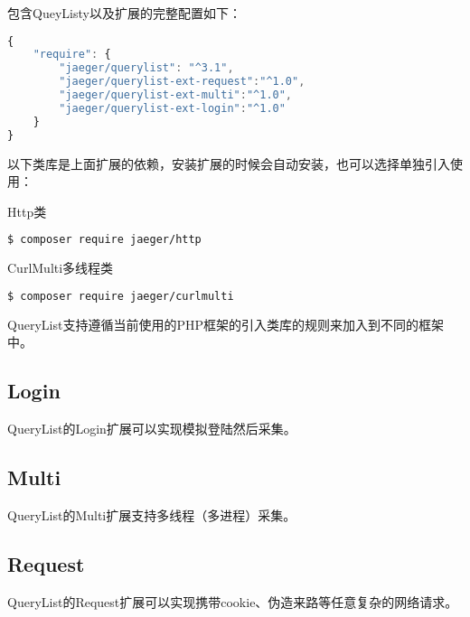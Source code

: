 包含QueyListy以及扩展的完整配置如下：

\begin{lstlisting}[language=JavaScript]
{
    "require": {
        "jaeger/querylist": "^3.1",
        "jaeger/querylist-ext-request":"^1.0",
        "jaeger/querylist-ext-multi":"^1.0",
        "jaeger/querylist-ext-login":"^1.0"
    }
}
\end{lstlisting}

以下类库是上面扩展的依赖，安装扩展的时候会自动安装，也可以选择单独引入使用：

\begin{compactitem}
\item Http类

\begin{lstlisting}[language=bash]
$ composer require jaeger/http
\end{lstlisting}

\item CurlMulti多线程类

\begin{lstlisting}[language=bash]
$ composer require jaeger/curlmulti
\end{lstlisting}

\end{compactitem}

QueryList支持遵循当前使用的PHP框架的引入类库的规则来加入到不同的框架中。

\subsection{Login}

QueryList的Login扩展可以实现模拟登陆然后采集。

\subsection{Multi}

QueryList的Multi扩展支持多线程（多进程）采集。


\subsection{Request}

QueryList的Request扩展可以实现携带cookie、伪造来路等任意复杂的网络请求。






\begin{lstlisting}[language=bash]

\end{lstlisting}




